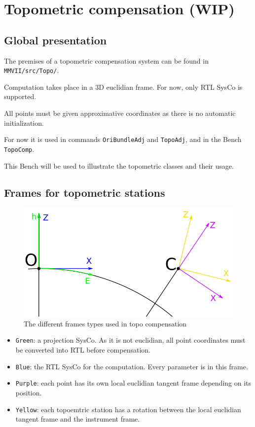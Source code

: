 
\section{Topometric compensation (WIP)}
\label{Chap:TopoProg}
\subsection{Global presentation}

The premises of a topometric compensation system can be found in \texttt{MMVII/src/Topo/}.

Computation takes place in a 3D euclidian frame. For now, only RTL SysCo is supported.

All points must be given approximative coordinates as there is no automatic initialization.

For now it is used in commands \texttt{OriBundleAdj} and \texttt{TopoAdj}, and in the Bench \texttt{TopoComp}.

This Bench will be used to illustrate the topometric classes and their usage.


\subsection{Frames for topometric stations}

\begin{figure}[!h]
\centering
\includegraphics[width=12cm]{Programmer/framesTopo.png}
\caption{The different frames types used in topo compensation}
\label{fig:topoFrames}
\end{figure}


 \begin{itemize}
    \item \texttt{Green}: a projection SysCo. As it is not euclidian, all point coordinates must be converted into RTL before compensation.
    \item \texttt{Blue}: the RTL SysCo for the computation. Every parameter is in this frame.
    \item \texttt{Purple}: each point has its own local euclidian tangent frame depending on its position.
    \item \texttt{Yellow}: each topoemtric station has a rotation between the local euclidian tangent frame and the instrument frame.
 \end{itemize}




